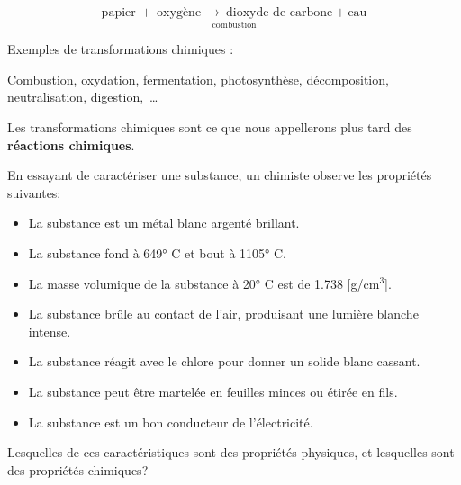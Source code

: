 \documentclass[
  11pt,
  a4paper,
  openany]{book}
\providecommand{\tightlist}{%
  \setlength{\itemsep}{0pt}\setlength{\parskip}{0pt}}
\begin{document}
\[ \underset{\text{combustion}}{\text{papier}\ +\ \text{oxygène} \ \longrightarrow \ \text{dioxyde de carbone} + \text{eau}} \]

Exemples de transformations chimiques :

Combustion, oxydation, fermentation, photosynthèse, décomposition, neutralisation, digestion,~\ldots{}

Les transformations chimiques sont ce que nous appellerons plus tard des \textbf{réactions chimiques}.

\begin{Exercise}
En essayant de caractériser une substance, un chimiste observe les propriétés suivantes:

\begin{itemize}
\tightlist
\item
  La substance est un métal blanc argenté brillant.
\item
  La substance fond à 649° C et bout à 1105° C.
\item
  La masse volumique de la substance à 20° C est de 1.738 {[}g/cm\(^3\){]}.
\item
  La substance brûle au contact de l'air, produisant une lumière blanche intense.
\item
  La substance réagit avec le chlore pour donner un solide blanc cassant.
\item
  La substance peut être martelée en feuilles minces ou étirée en fils.
\item
  La substance est un bon conducteur de l'électricité.
\end{itemize}

Lesquelles de ces caractéristiques sont des propriétés physiques, et lesquelles sont des propriétés chimiques?

\end{Exercise}
\end{document}
